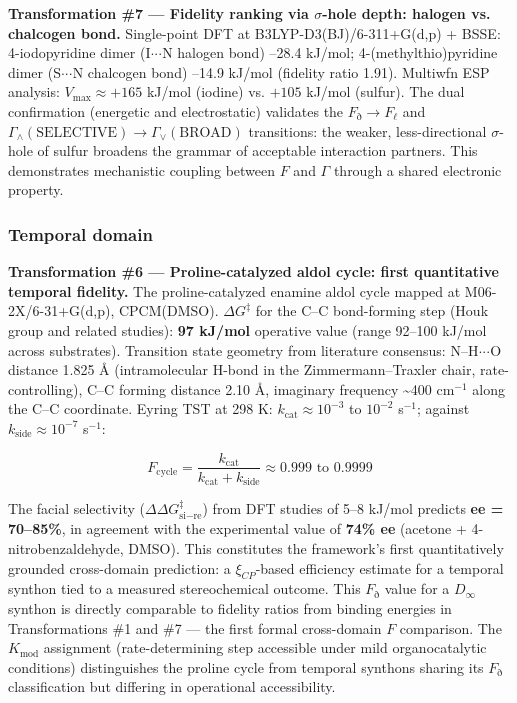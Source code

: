 \documentclass[12pt,a4paper]{article}
\begin{document}
\textbf{Transformation \#7 --- Fidelity ranking via $\sigma$-hole depth: halogen vs. chalcogen bond.} Single-point DFT at B3LYP-D3(BJ)/6-311+G(d,p) + BSSE: 4-iodopyridine dimer (I$\cdot$$\cdot$$\cdot$N halogen bond) --28.4 kJ/mol; 4-(methylthio)pyridine dimer (S$\cdot$$\cdot$$\cdot$N chalcogen bond) --14.9 kJ/mol (fidelity ratio 1.91). Multiwfn ESP analysis: $V_{\text{max}} \approx +165$ kJ/mol (iodine) vs. $+105$ kJ/mol (sulfur). The dual confirmation (energetic and electrostatic) validates the $F_{\eth} \to F_{\ell}$ and $\Gamma_{\wedge}(\text{SELECTIVE}) \to \Gamma_{\vee}(\text{BROAD})$ transitions: the weaker, less-directional $\sigma$-hole of sulfur broadens the grammar of acceptable interaction partners. This demonstrates mechanistic coupling between $F$ and $\Gamma$ through a shared electronic property.

\subsubsection{Temporal domain}

\textbf{Transformation \#6 --- Proline-catalyzed aldol cycle: first quantitative temporal fidelity.} The proline-catalyzed enamine aldol cycle mapped at M06-2X/6-31+G(d,p), CPCM(DMSO). $\Delta G^{\ddagger}$ for the C--C bond-forming step (Houk group and related studies): \textbf{97 kJ/mol} operative value (range 92--100 kJ/mol across substrates). Transition state geometry from literature consensus: N--H$\cdot$$\cdot$$\cdot$O distance 1.825 Å (intramolecular H-bond in the Zimmermann--Traxler chair, rate-controlling), C--C forming distance 2.10 Å, imaginary frequency \textasciitilde{}400 cm$^{-1}$ along the C--C coordinate. Eyring TST at 298 K: $k_{\text{cat}} \approx 10^{-3}$ to $10^{-2}$ s$^{-1}$; against $k_{\text{side}} \approx 10^{-7}$ s$^{-1}$:

\[F_{\text{cycle}} = \frac{k_{\text{cat}}}{k_{\text{cat}} + k_{\text{side}}} \approx 0.999 \text{ to } 0.9999\]

The facial selectivity ($\Delta\Delta G^{\ddagger}_{\text{si}-\text{re}}$) from DFT studies of 5--8 kJ/mol predicts \textbf{ee = 70--85\%}, in agreement with the experimental value of \textbf{74\% ee} (acetone + 4-nitrobenzaldehyde, DMSO). This constitutes the framework's first quantitatively grounded cross-domain prediction: a $\xi_{CP}$-based efficiency estimate for a temporal synthon tied to a measured stereochemical outcome. This $F_{\eth}$ value for a $D_{\infty}$ synthon is directly comparable to fidelity ratios from binding energies in Transformations \#1 and \#7 --- the first formal cross-domain $F$ comparison. The $K_{\text{mod}}$ assignment (rate-determining step accessible under mild organocatalytic conditions) distinguishes the proline cycle from temporal synthons sharing its $F_{\eth}$ classification but differing in operational accessibility.
\end{document}
